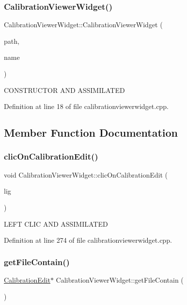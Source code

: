 \subsubsection{\texorpdfstring{CalibrationViewerWidget()}{CalibrationViewerWidget()}}
{\footnotesize\ttfamily Calibration\+Viewer\+Widget\+::\+Calibration\+Viewer\+Widget (\begin{DoxyParamCaption}\item[{Q\+String}]{path,  }\item[{Q\+String}]{name }\end{DoxyParamCaption})}

C\+O\+N\+S\+T\+R\+U\+C\+T\+OR A\+ND A\+S\+S\+I\+M\+I\+L\+A\+T\+ED 

Definition at line 18 of file calibrationviewerwidget.\+cpp.



\subsection{Member Function Documentation}
\mbox{\label{class_calibration_viewer_widget_a6df9ecb8964b01d71f7e9be5e17c0d36}} 
\subsubsection{\texorpdfstring{clicOnCalibrationEdit()}{clicOnCalibrationEdit()}}
{\footnotesize\ttfamily void Calibration\+Viewer\+Widget\+::clic\+On\+Calibration\+Edit (\begin{DoxyParamCaption}\item[{int}]{lig }\end{DoxyParamCaption})}

L\+E\+FT C\+L\+IC A\+ND A\+S\+S\+I\+M\+I\+L\+A\+T\+ED 

Definition at line 274 of file calibrationviewerwidget.\+cpp.

\mbox{\label{class_calibration_viewer_widget_a48436eda300147eddd0e25f574dbca62}} 
\subsubsection{\texorpdfstring{getFileContain()}{getFileContain()}}
{\footnotesize\ttfamily \mbox{\hyperlink{class_calibration_edit}{Calibration\+Edit}}$\ast$ Calibration\+Viewer\+Widget\+::get\+File\+Contain (\begin{DoxyParamCaption}{ }\end{DoxyParamCaption})\hspace{0.3cm}{\ttfamily [inline]}}



